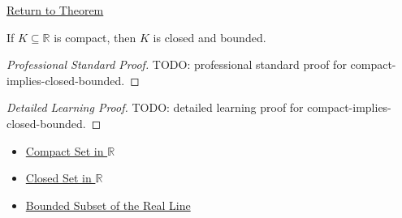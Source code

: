 \newpage
{}
\label{prf:compact-implies-closed-bounded}

\begin{remark*}[Return]
\hyperref[thm:compact-implies-closed-bounded]{Return to Theorem}
\end{remark*}

\begin{theorem*}
If $K\subseteq\mathbb{R}$ is compact, then $K$ is closed and bounded.
\end{theorem*}

\begin{proof}[Professional Standard Proof]
\LRAProofBodyStart
TODO: professional standard proof for compact-implies-closed-bounded.
\end{proof}

\begin{proof}[Detailed Learning Proof]
\LRAProofBodyStart
TODO: detailed learning proof for compact-implies-closed-bounded.
\end{proof}

\begin{remark*}
\end{remark*}

\begin{dependencies}
\begin{itemize}
  \item \hyperref[def:compact-set]{Compact Set in $\mathbb{R}$}
  \item \hyperref[def:closed-set]{Closed Set in $\mathbb{R}$}
  \item \hyperref[def:bounded-subset-of-r]{Bounded Subset of the Real Line}
\end{itemize}
\end{dependencies}

\clearpage
